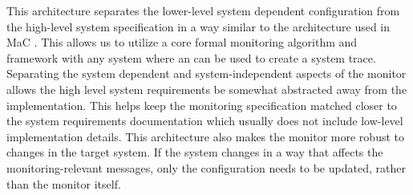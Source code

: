 This architecture separates the lower-level system dependent configuration from the high-level system specification in a way similar to the architecture used in MaC \cite{Kim2004}.
This allows us to utilize a core formal monitoring algorithm and framework with any system where an \sfmap can be used to create a system trace.
Separating the system dependent and system-independent aspects of the monitor allows the high level system requirements be somewhat abstracted away from the implementation.
This helps keep the monitoring specification matched closer to the system requirements documentation which usually does not include low-level implementation details.
This architecture also makes the monitor more robust to changes in the target system.
If the system changes in a way that affects the monitoring-relevant messages, only the \sfmap configuration needs to be updated, rather than the monitor itself.
